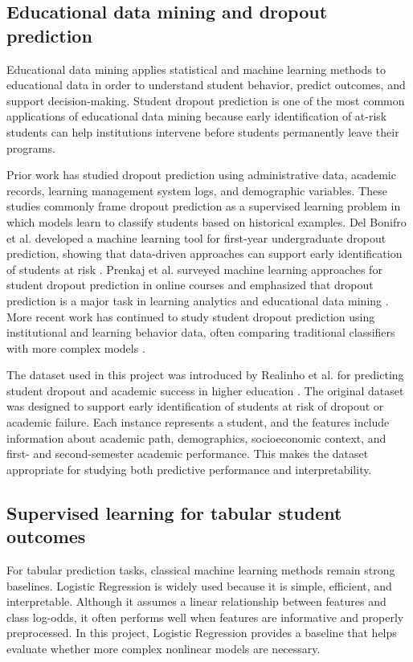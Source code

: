 \documentclass{article}
\begin{document}
\subsection{Educational data mining and dropout prediction}

Educational data mining applies statistical and machine learning methods to educational data in order to understand student behavior, predict outcomes, and support decision-making. Student dropout prediction is one of the most common applications of educational data mining because early identification of at-risk students can help institutions intervene before students permanently leave their programs.

Prior work has studied dropout prediction using administrative data, academic records, learning management system logs, and demographic variables. These studies commonly frame dropout prediction as a supervised learning problem in which models learn to classify students based on historical examples. Del Bonifro et al. developed a machine learning tool for first-year undergraduate dropout prediction, showing that data-driven approaches can support early identification of students at risk \citep{delbonifro2020dropout}. Prenkaj et al. surveyed machine learning approaches for student dropout prediction in online courses and emphasized that dropout prediction is a major task in learning analytics and educational data mining \citep{prenkaj2020survey}. More recent work has continued to study student dropout prediction using institutional and learning behavior data, often comparing traditional classifiers with more complex models \citep{goren2024early}.

The dataset used in this project was introduced by Realinho et al. for predicting student dropout and academic success in higher education \citep{realinho2022predicting}. The original dataset was designed to support early identification of students at risk of dropout or academic failure. Each instance represents a student, and the features include information about academic path, demographics, socioeconomic context, and first- and second-semester academic performance. This makes the dataset appropriate for studying both predictive performance and interpretability.

\subsection{Supervised learning for tabular student outcomes}

For tabular prediction tasks, classical machine learning methods remain strong baselines. Logistic Regression is widely used because it is simple, efficient, and interpretable. Although it assumes a linear relationship between features and class log-odds, it often performs well when features are informative and properly preprocessed. In this project, Logistic Regression provides a baseline that helps evaluate whether more complex nonlinear models are necessary.
\end{document}
